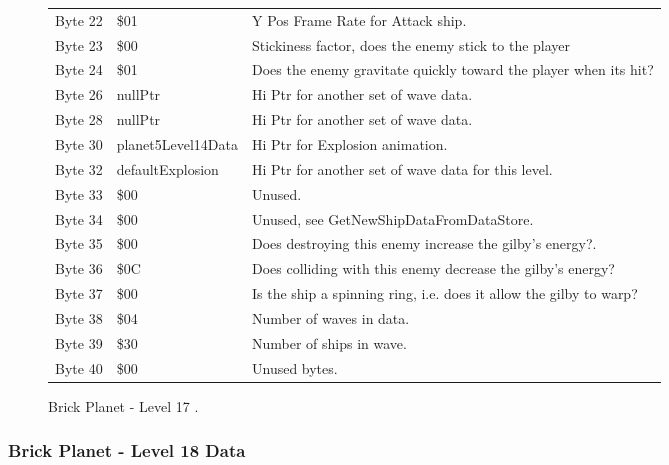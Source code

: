 \begin{figure}[H]
{\begin{adjustbox}{width=12cm}
\begin{tabular}{lll}
 Byte 22 & \$01                & Y Pos Frame Rate for Attack ship.                                  \\
 Byte 23 & \$00                & Stickiness factor, does the enemy stick to the player              \\
 Byte 24 & \$01                & Does the enemy gravitate quickly toward the player when its hit?   \\
 Byte 26 & nullPtr            & Hi Ptr for another set of wave data.                               \\
 Byte 28 & nullPtr            & Hi Ptr for another set of wave data.                               \\
 Byte 30 & planet5Level14Data & Hi Ptr for Explosion animation.                                    \\
 Byte 32 & defaultExplosion   & Hi Ptr for another set of wave data for this level.                \\
 Byte 33 & \$00                & Unused.                                                            \\
 Byte 34 & \$00                & Unused, see GetNewShipDataFromDataStore.                           \\
 Byte 35 & \$00                & Does destroying this enemy increase the gilby's energy?.           \\
 Byte 36 & \$0C                & Does colliding with this enemy decrease the gilby's energy?        \\
 Byte 37 & \$00                & Is the ship a spinning ring, i.e. does it allow the gilby to warp? \\
 Byte 38 & \$04                & Number of waves in data.                                           \\
 Byte 39 & \$30                & Number of ships in wave.                                           \\
 Byte 40 & \$00                & Unused bytes.                                                      \\
\bottomrule
\end{tabular}

  \end{adjustbox}

  }\caption*{Brick Planet - Level 17
.}
\end{figure}

\clearpage
\subsubsection{Brick Planet - Level 18 Data}

